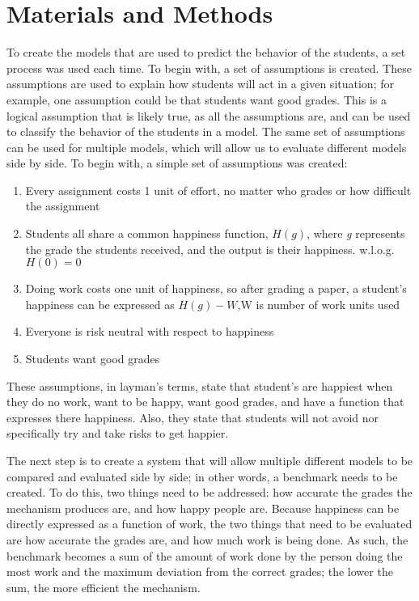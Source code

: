 \documentclass[12pt, Arial]{article}
\begin{document}
\section{Materials and Methods}
To create the models that are used to predict the behavior of the students, a set process was used each time. To begin with, a set of assumptions is created. These assumptions are used to explain how students will act in a given situation; for example, one assumption could be that students want good grades. This is a logical assumption that is likely true, as all the assumptions are, and can be used to classify the behavior of the students in a model. The same set of assumptions can be used for multiple models, which will allow us to evaluate different models side by side. To begin with, a simple set of assumptions was created:
\begin{enumerate}
  \item Every assignment costs 1 unit of effort, no matter who grades or how difficult the assignment
  \item Students all share a common happiness function, $H(g)$, where \emph{g} represents the grade the students received, and the output is their happiness. w.l.o.g. $H(0)=0$
  \item Doing work costs one unit of happiness, so after grading a paper, a student's happiness can be expressed as $H(g)-W$,W is number of work units used
  \item Everyone is risk neutral with respect to happiness
  \item Students want good grades
\end{enumerate}

These assumptions, in layman's terms, state that student's are happiest when they do no work, want to be happy, want good grades, and have a function that expresses there happiness. Also, they state that students will not avoid nor specifically try and take risks to get happier.

The next step is to create a system that will allow multiple different models to be compared and evaluated side by side; in other words, a benchmark needs to be created. To do this, two things need to be addressed: how accurate the grades the mechanism produces are, and how happy people are. Because happiness can be directly expressed as a function of work, the two things that need to be evaluated are how accurate the grades are, and how much work is being done. As such, the benchmark becomes a sum of the amount of work done by the person doing the most work and the maximum deviation from the correct grades; the lower the sum, the more efficient the mechanism.
\end{document}
